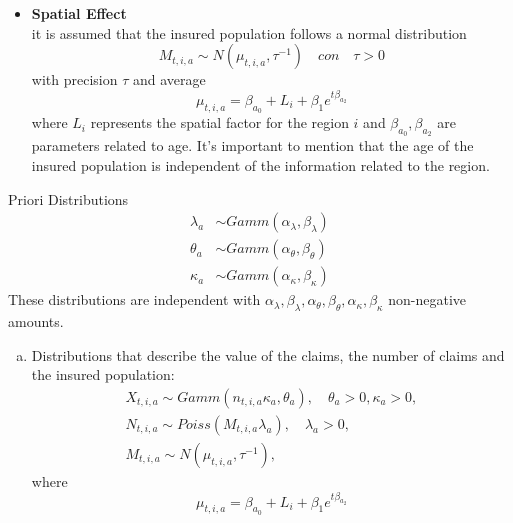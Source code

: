 \documentclass[10pt]{beamer} %
\begin{document}
\begin{frame}
\begin{itemize}
    \item \textbf{Spatial Effect}\\
    it is assumed that the insured population follows a normal distribution $$M_{t,i,a}\sim N(\mu_{t,i,a},\tau^{-1})\quad con \quad \tau>0$$ with precision $\tau$ and average 
\begin{equation}
	\label{mu_t,i,a}
	\mu_{t,i,a}=\beta_{a_0}+L_i+\beta_{1}e^{t\beta_{a_2}}
\end{equation}
 where $L_i$ represents the spatial factor for the region $i$ and $\beta_{a_0},\beta_{a_2}$ are parameters related to age. It's important to mention that the age of the insured population is independent of the information related to the region. 
\end{itemize}
    
\end{frame}
\begin{frame}{Priori Distributions}
\begin{align*}
\lambda_{a}&\sim Gamm(\alpha_{\lambda},\beta_{\lambda})\\
\theta_{a}&\sim Gamm(\alpha_{\theta},\beta_{\theta})\\
\kappa_{a}&\sim Gamm(\alpha_{	\kappa},\beta_{	\kappa})
\end{align*}
These distributions are independent with $\alpha_{\lambda},\beta_{\lambda},\alpha_{\theta},\beta_{\theta},\alpha_{	\kappa},\beta_{	\kappa}$ non-negative amounts.
\begin{enumerate}[a)]
	\item Distributions that describe the value of the claims, the number of claims and the insured population:
	\begin{align*}
	X_{t,i,a}\sim Gamm(n_{t,i,a}\kappa_{a},\theta_a),\quad \theta_a>0,\kappa_a>0,\\
	N_{t,i,a}\sim Poiss(M_{t,i,a}\lambda_a),\quad \lambda_a>0,\\
	M_{t,i,a}\sim N(\mu_{t,i,a},\tau^{-1}),
	\end{align*}
	where $$\mu_{t,i,a}=\beta_{a_0}+L_i+\beta_1e^{t\beta_{a_2}}$$
	
\end{enumerate}

\end{frame}
\end{document}
